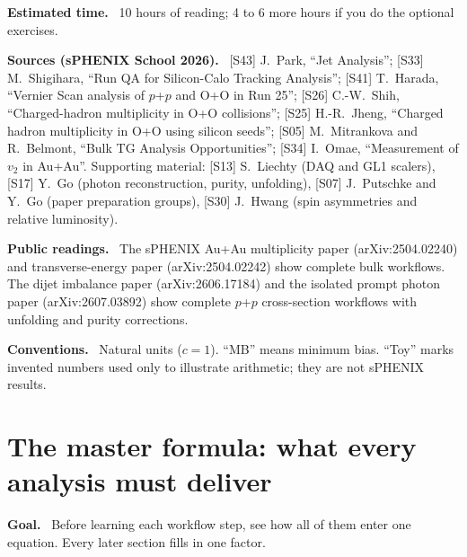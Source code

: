 \documentclass[11pt,letterpaper]{article}
\newcommand{\hd}[1]{\par\smallskip\noindent\textbf{\color{blue!50!black}#1.}\ }
\begin{document}
\hd{Estimated time} 10 hours of reading; 4 to 6 more hours if you do the optional exercises.

\hd{Sources (sPHENIX School 2026)} [S43] J.\ Park, ``Jet Analysis''; [S33] M.\ Shigihara, ``Run QA for Silicon-Calo Tracking
Analysis''; [S41] T.\ Harada, ``Vernier Scan analysis of $p$+$p$ and O+O in Run 25''; [S26] C.-W.\ Shih, ``Charged-hadron
multiplicity in O+O collisions''; [S25] H.-R.\ Jheng, ``Charged hadron multiplicity in O+O using silicon seeds''; [S05]
M.\ Mitrankova and R.\ Belmont, ``Bulk TG Analysis Opportunities''; [S34] I.\ Omae, ``Measurement of $v_2$ in Au+Au''. Supporting
material: [S13] S.\ Liechty (DAQ and GL1 scalers), [S17] Y.\ Go (photon reconstruction, purity, unfolding), [S07] J.\ Putschke and
Y.\ Go (paper preparation groups), [S30] J.\ Hwang (spin asymmetries and relative luminosity).

\hd{Public readings} The sPHENIX Au+Au multiplicity paper (arXiv:2504.02240) and transverse-energy paper (arXiv:2504.02242) show
complete bulk workflows. The dijet imbalance paper (arXiv:2606.17184) and the isolated prompt photon paper (arXiv:2607.03892) show
complete $p$+$p$ cross-section workflows with unfolding and purity corrections.

\hd{Conventions} Natural units ($c=1$). ``MB'' means minimum bias. ``Toy'' marks invented numbers used only to illustrate arithmetic;
they are not sPHENIX results.

\section{The master formula: what every analysis must deliver}
\hd{Goal} Before learning each workflow step, see how all of them enter one equation. Every later section fills in one factor.
\end{document}
